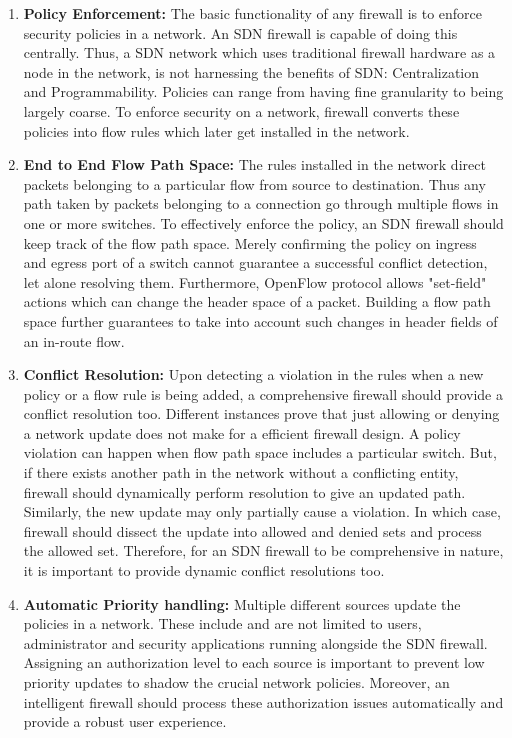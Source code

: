 \begin{enumerate}
	\item \textbf{Policy Enforcement: } 
	The basic functionality of any firewall is to enforce security policies in a network. An SDN firewall is capable of doing this centrally. Thus, a SDN network which uses traditional firewall hardware as a node in the network, is not harnessing the benefits of SDN: Centralization and Programmability. Policies can range from having fine granularity to being largely coarse. To enforce security on a network, firewall converts these policies into flow rules which later get installed in the network.  
	\item \textbf{End to End Flow Path Space: }
	The rules installed in the network direct packets belonging to a particular flow from source to destination. Thus any path taken by packets belonging to a connection go through multiple flows in one or more switches. To effectively enforce the policy, an SDN firewall should keep track of the flow path space. Merely confirming the policy on ingress and egress port of a switch cannot guarantee a successful conflict detection, let alone resolving them. Furthermore, OpenFlow protocol allows "set-field" actions which can change the header space of a packet. Building a flow path space further guarantees to take into account such changes in header fields of an in-route flow. 
	\item \textbf{Conflict Resolution: }
	Upon detecting a violation in the rules when a new policy or a flow rule is being added, a comprehensive firewall should provide a conflict resolution too. Different instances prove that just allowing or denying a network update does not make for a efficient firewall design. A policy violation can happen when flow path space includes a particular switch. But, if there exists another path in the network without a conflicting entity, firewall should dynamically perform resolution to give an updated path. Similarly, the new update may only partially cause a violation. In which case, firewall should dissect the update into allowed and denied sets and process the allowed set. Therefore, for an SDN firewall to be  comprehensive in nature, it is important to provide dynamic conflict resolutions too.    
	\item \textbf{Automatic Priority handling: }
	Multiple different sources update the policies in a network. These include and are not limited to users, administrator and security applications running alongside the SDN firewall. Assigning an authorization level to each source is important to prevent low priority updates to shadow the crucial network policies. Moreover, an intelligent firewall should process these authorization issues automatically and provide a robust user experience.

\end{enumerate}
